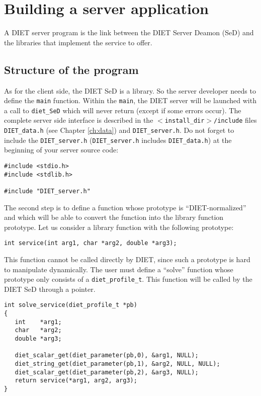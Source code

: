 \chapter{Building a server application}
\label{ch:server}

A DIET server program is the link between the DIET Server Deamon (SeD) and the libraries that
implement the service to offer.

\section{Structure of the program}
\label{sec:sv_struct}

As for the client side, the DIET SeD is a library. So the server developer needs
to define the \texttt{main} function. Within the \texttt{main}, the DIET server
will be launched with a call to \texttt{diet\_SeD} which will never return
(except if some errors occur). The complete server side interface is described
in the \texttt{$<$install\_dir$>$/include} files \texttt{DIET\_data.h} (see
Chapter \ref{ch:data}) and \texttt{DIET\_server.h}. Do not forget to include the \texttt{DIET\_server.h} (\texttt{DIET\_server.h} includes \texttt{DIET\_data.h}) at the beginning of your server source code:

{\footnotesize
\begin{verbatim}
#include <stdio.h>
#include <stdlib.h>

#include "DIET_server.h"
\end{verbatim}
}

The second step is to define a function whose prototype is ``DIET-normalized''
and which will be able to convert the function into the library function prototype.
Let us consider a library function with the following prototype:
{\footnotesize
\begin{verbatim}
int service(int arg1, char *arg2, double *arg3);
\end{verbatim}
}

This function cannot be called directly by DIET, since such a prototype is hard
to manipulate dynamically. The user must define a ``solve'' function whose
prototype only consists of a \texttt{diet\_profile\_t}.
This function will be called by the DIET SeD through a pointer.
{\footnotesize
\begin{verbatim}
int solve_service(diet_profile_t *pb)
{
   int    *arg1;
   char   *arg2;
   double *arg3;

   diet_scalar_get(diet_parameter(pb,0), &arg1, NULL);
   diet_string_get(diet_parameter(pb,1), &arg2, NULL, NULL);
   diet_scalar_get(diet_parameter(pb,2), &arg3, NULL);
   return service(*arg1, arg2, arg3);
}
\end{verbatim}
}

